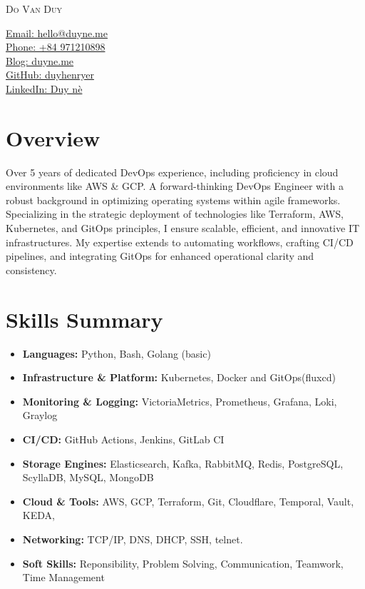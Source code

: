 \documentclass[11pt, a4paper]{article}
\begin{document}
\noindent
\begin{minipage}[t]{0.60\textwidth}
    \Huge\scshape Do Van Duy
\end{minipage}%
\begin{minipage}[t]{0.40\textwidth}
    \raggedleft
    \normalsize
    \href{mailto:hello@duyne.me}{Email: hello@duyne.me}\\
    \href{tel:+84971210898}{Phone: +84 971210898}\\
    \href{https://duyne.me}{Blog: duyne.me}\\
    \href{https://github.com/duyhenryerz}{GitHub: duyhenryer}\\
    \href{https://linkedin.com/in/duyne}{LinkedIn: Duy nè}
\end{minipage}
\vspace{0.75em}


\section{Overview}
\begingroup
{}
Over 5 years of dedicated DevOps experience, including proficiency in cloud environments like AWS \& GCP. A forward-thinking DevOps Engineer with a robust background in optimizing operating systems within agile frameworks. Specializing in the strategic deployment of technologies like Terraform, AWS, Kubernetes, and GitOps principles, I ensure scalable, efficient, and innovative IT infrastructures. My expertise extends to automating workflows, crafting CI/CD pipelines, and integrating GitOps for enhanced operational clarity and consistency.
\endgroup

\section{Skills Summary}
\begin{itemize}[leftmargin=*, label={}]
    \item \textbf{Languages:} Python, Bash, Golang (basic)
    \item \textbf{Infrastructure \& Platform:} Kubernetes, Docker and GitOps(fluxcd)
    \item \textbf{Monitoring \& Logging:} VictoriaMetrics, Prometheus, Grafana, Loki, Graylog
    \item \textbf{CI/CD:} GitHub Actions, Jenkins, GitLab CI
    \item \textbf{Storage Engines:} Elasticsearch, Kafka, RabbitMQ, Redis, PostgreSQL, ScyllaDB, MySQL, MongoDB
    \item \textbf{Cloud \& Tools:} AWS, GCP, Terraform, Git, Cloudflare, Temporal, Vault, KEDA,
    \item \textbf{Networking:} TCP/IP, DNS, DHCP, SSH, telnet.
    \item \textbf{Soft Skills:} Reponsibility, Problem Solving, Communication, Teamwork, Time Management    
\end{itemize}
\end{document}
